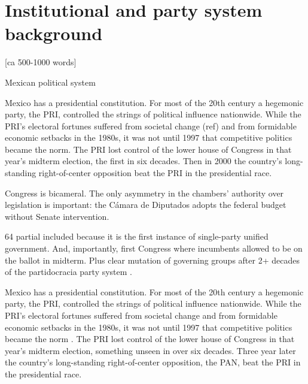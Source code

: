 \documentclass[letter,12pt]{article}
\begin{document}


\section{Institutional and party system background} [ca 500-1000 words]

Mexican political system

Mexico has a presidential constitution. For most of the 20th century a hegemonic party, the PRI, controlled the strings of political influence nationwide. While the PRI's electoral fortunes suffered from societal change (ref) and from formidable economic setbacks in the 1980s, it was not until 1997 that competitive politics became the norm. The PRI lost control of the lower house of Congress in that year's midterm election, the first in six decades. Then in 2000 the country's long-standing right-of-center opposition beat the PRI in the presidential race. 

Congress is bicameral. The only asymmetry in the chambers' authority over legislation is important: the Cámara de Diputados adopts the federal budget without Senate intervention. 

64 partial included because it is the first instance of single-party unified government. And, importantly, first Congress where incumbents allowed to be on the ballot in midterm. Plus clear mutation of governing groups after 2+ decades of the partidocracia party system \citep{magar.2007ref.2015,magar.estevez.rosas.2010}. 


Mexico has a presidential constitution. For most of the 20th century a hegemonic party, the PRI, controlled the strings of political influence nationwide. While the PRI's electoral fortunes suffered from societal change and from formidable economic setbacks in the 1980s, it was not until 1997 that competitive politics became the norm \citep{cosio.villegas.1981,molinar.1991a,cornelius.1996}. The PRI lost control of the lower house of Congress in that year's midterm election, something unseen in over six decades. Three year later the country's long-standing right-of-center opposition, the PAN, beat the PRI in the presidential race. 
\end{document}
